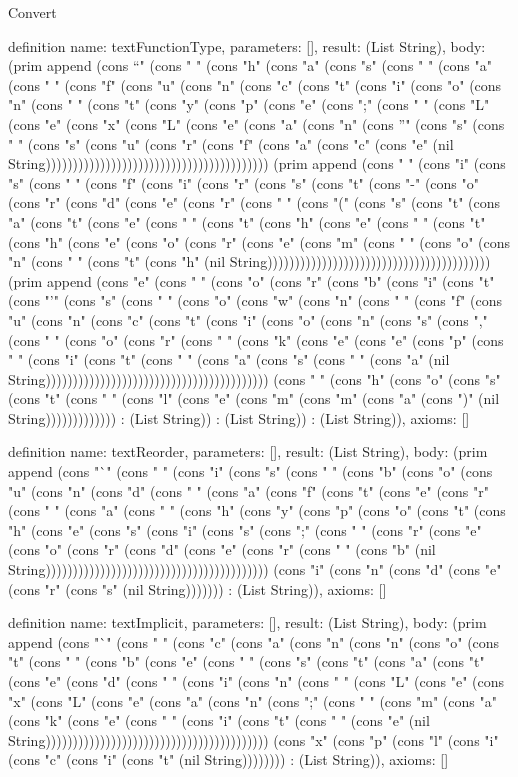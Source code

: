 \begin{lexlean}{Convert}
\begin{semanticmodule}
definition{
  name: textFunctionType,
  parameters: [],
  result: (List String),
  body: (prim append (cons "`" (cons " " (cons "h" (cons "a" (cons "s" (cons " " (cons "a" (cons " " (cons "f" (cons "u" (cons "n" (cons "c" (cons "t" (cons "i" (cons "o" (cons "n" (cons " " (cons "t" (cons "y" (cons "p" (cons "e" (cons ";" (cons " " (cons "L" (cons "e" (cons "x" (cons "L" (cons "e" (cons "a" (cons "n" (cons "'" (cons "s" (cons " " (cons "s" (cons "u" (cons "r" (cons "f" (cons "a" (cons "c" (cons "e" (nil String))))))))))))))))))))))))))))))))))))))))) (prim append (cons " " (cons "i" (cons "s" (cons " " (cons "f" (cons "i" (cons "r" (cons "s" (cons "t" (cons "-" (cons "o" (cons "r" (cons "d" (cons "e" (cons "r" (cons " " (cons "(" (cons "s" (cons "t" (cons "a" (cons "t" (cons "e" (cons " " (cons "t" (cons "h" (cons "e" (cons " " (cons "t" (cons "h" (cons "e" (cons "o" (cons "r" (cons "e" (cons "m" (cons " " (cons "o" (cons "n" (cons " " (cons "t" (cons "h" (nil String))))))))))))))))))))))))))))))))))))))))) (prim append (cons "e" (cons " " (cons "o" (cons "r" (cons "b" (cons "i" (cons "t" (cons "'" (cons "s" (cons " " (cons "o" (cons "w" (cons "n" (cons " " (cons "f" (cons "u" (cons "n" (cons "c" (cons "t" (cons "i" (cons "o" (cons "n" (cons "s" (cons "," (cons " " (cons "o" (cons "r" (cons " " (cons "k" (cons "e" (cons "e" (cons "p" (cons " " (cons "i" (cons "t" (cons " " (cons "a" (cons "s" (cons " " (cons "a" (nil String))))))))))))))))))))))))))))))))))))))))) (cons " " (cons "h" (cons "o" (cons "s" (cons "t" (cons " " (cons "l" (cons "e" (cons "m" (cons "m" (cons "a" (cons ")" (nil String))))))))))))) : (List String)) : (List String)) : (List String)),
  axioms: []
}

definition{
  name: textReorder,
  parameters: [],
  result: (List String),
  body: (prim append (cons "`" (cons " " (cons "i" (cons "s" (cons " " (cons "b" (cons "o" (cons "u" (cons "n" (cons "d" (cons " " (cons "a" (cons "f" (cons "t" (cons "e" (cons "r" (cons " " (cons "a" (cons " " (cons "h" (cons "y" (cons "p" (cons "o" (cons "t" (cons "h" (cons "e" (cons "s" (cons "i" (cons "s" (cons ";" (cons " " (cons "r" (cons "e" (cons "o" (cons "r" (cons "d" (cons "e" (cons "r" (cons " " (cons "b" (nil String))))))))))))))))))))))))))))))))))))))))) (cons "i" (cons "n" (cons "d" (cons "e" (cons "r" (cons "s" (nil String))))))) : (List String)),
  axioms: []
}

definition{
  name: textImplicit,
  parameters: [],
  result: (List String),
  body: (prim append (cons "`" (cons " " (cons "c" (cons "a" (cons "n" (cons "n" (cons "o" (cons "t" (cons " " (cons "b" (cons "e" (cons " " (cons "s" (cons "t" (cons "a" (cons "t" (cons "e" (cons "d" (cons " " (cons "i" (cons "n" (cons " " (cons "L" (cons "e" (cons "x" (cons "L" (cons "e" (cons "a" (cons "n" (cons ";" (cons " " (cons "m" (cons "a" (cons "k" (cons "e" (cons " " (cons "i" (cons "t" (cons " " (cons "e" (nil String))))))))))))))))))))))))))))))))))))))))) (cons "x" (cons "p" (cons "l" (cons "i" (cons "c" (cons "i" (cons "t" (nil String)))))))) : (List String)),
  axioms: []
}


\end{semanticmodule}
\end{lexlean}
